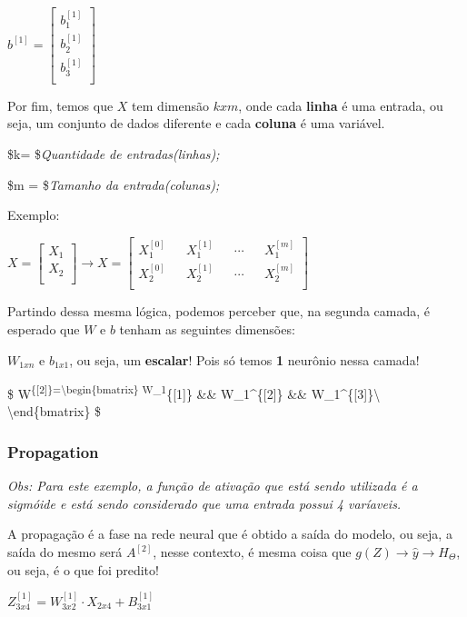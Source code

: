 \documentclass[12pt]{article}
\begin{document}
\(b^{[1]}=\begin{bmatrix}  b_1^{[1]} \\  b_2^{[1]} \\  b_3^{[1]} \\  \end{bmatrix}\)

Por fim, temos que \(X\) tem dimensão \(kxm\), onde cada \textbf{linha}
é uma entrada, ou seja, um conjunto de dados diferente e cada
\textbf{coluna} é uma variável.

\$k= \$\emph{Quantidade de entradas(linhas);}

\$m = \$\emph{Tamanho da entrada(colunas);}

Exemplo:

\(X=\begin{bmatrix}  X_1 \\  X_2 \\  \end{bmatrix} \rightarrow X=\begin{bmatrix}  X_1^{[0]} && X_1^{[1]} && \cdots && X_1^{[m]} \\  X_2^{[0]} && X_2^{[1]} && \cdots && X_2^{[m]} \\  \end{bmatrix}\)

Partindo dessa mesma lógica, podemos perceber que, na segunda camada, é
esperado que \(W\) e \(b\) tenham as seguintes dimensões:

\(W_{1xn}\) e \(b_{1x1}\), ou seja, um \textbf{escalar}! Pois só temos
\textbf{1} neurônio nessa camada!

\$ W\textsuperscript{\{{[}2{]}\}=\textbackslash{}begin\{bmatrix\}
W\_1}\{{[}1{]}\} \&\& W\_1\^{}\{{[}2{]}\} \&\&
W\_1\^{}\{{[}3{]}\}\textbackslash{} \textbackslash{}end\{bmatrix\} \$

\hypertarget{propagation}{%
\subsubsection{Propagation}\label{propagation}}

\emph{Obs: Para este exemplo, a função de ativação que está sendo
utilizada é a sigmóide e está sendo considerado que uma entrada possui 4
varíaveis.}

A propagação é a fase na rede neural que é obtido a saída do modelo, ou
seja, a saída do mesmo será \(A^{[2]}\), nesse contexto, é mesma coisa
que \(g(Z) \rightarrow \hat{y} \rightarrow H_{\Theta}\), ou seja, é o
que foi predito!

\(Z^{[1]}_{3x4} = W^{[1]}_{3x2} \cdot X_{2x4} + B^{[1]}_{3x1}\)
\end{document}

